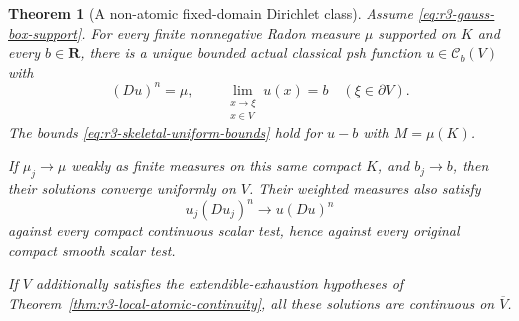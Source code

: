 \documentclass[11pt,a4paper]{article}
\numberwithin{equation}{section}
\newtheorem{theorem}{Theorem}[section]
\theoremstyle{definition}
\theoremstyle{remark}
\newcommand{\Cb}{\mathcal C_b}
\begin{document}
\begin{theorem}[A non-atomic fixed-domain Dirichlet class]
\label{thm:r3-skeletal-dirichlet}
Assume \eqref{eq:r3-gauss-box-support}. For every finite
nonnegative Radon measure $\mu$ supported on $K$ and every
$b\in\mathbf R$, there is a unique bounded actual classical
psh function $u\in\Cb(V)$ with
\[
 (Du)^n=\mu,
 \qquad\lim_{\substack{x\to\xi\\x\in V}}u(x)=b
                                      \quad(\xi\in\partial V).
\]
The bounds \eqref{eq:r3-skeletal-uniform-bounds} hold for
$u-b$ with $M=\mu(K)$.

If $\mu_j\to\mu$ weakly as finite measures on this same
compact $K$, and $b_j\to b$, then their solutions converge
uniformly on $V$. Their weighted measures also satisfy
\[
 u_j(Du_j)^n\longrightarrow u(Du)^n
\]
against every compact continuous scalar test, hence against
every original compact smooth scalar test.

If $V$ additionally satisfies the extendible-exhaustion
hypotheses of Theorem~\ref{thm:r3-local-atomic-continuity},
all these solutions are continuous on $\overline V$.
\end{theorem}
\end{document}
